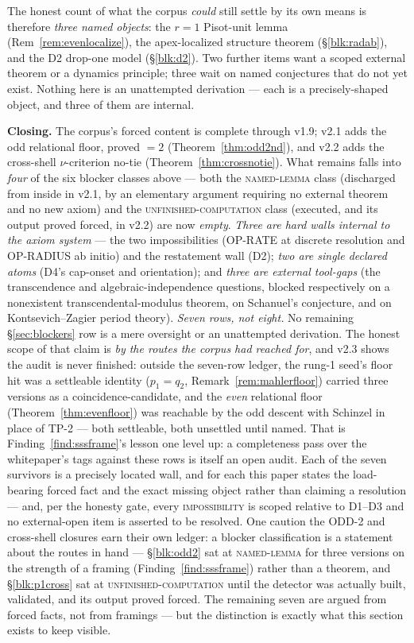 \documentclass[11pt]{article}
\theoremstyle{plain}
\theoremstyle{definition}
\theoremstyle{remark}
\begin{document}
\noindent The honest count of what the corpus \emph{could} still settle by its own
means is therefore \emph{three named objects}: the $r=1$ Pisot-unit lemma
(Rem~\ref{rem:evenlocalize}), the apex-localized structure theorem
(\S\ref{blk:radab}), and the D2 drop-one model (\S\ref{blk:d2}). Two further items
want a scoped external theorem or a dynamics principle; three wait on named
conjectures that do not yet exist. Nothing here is an unattempted derivation ---
each is a precisely-shaped object, and three of them are internal.

\smallskip\noindent
\textbf{Closing.} The corpus's forced content is complete through v1.9; v2.1 adds
the odd relational floor, proved $=2$ (Theorem~\ref{thm:odd2nd}), and v2.2 adds
the cross-shell $\nu$-criterion no-tie (Theorem~\ref{thm:crossnotie}). What
remains falls into \emph{four} of the six blocker classes above --- both the
\textsc{named-lemma} class (discharged from inside in v2.1, by an elementary
argument requiring no external theorem and no new axiom) and the
\textsc{unfinished-computation} class (executed, and its output proved forced, in
v2.2) are now \emph{empty}. \emph{Three are hard walls internal to the axiom
system} --- the two impossibilities (OP-RATE at discrete resolution and OP-RADIUS
ab initio) and the restatement wall (D2); \emph{two are single declared atoms}
(D4's cap-onset and orientation); and \emph{three are external tool-gaps} (the
transcendence and algebraic-independence questions, blocked respectively on a
nonexistent transcendental-modulus theorem, on Schanuel's conjecture, and on
Kontsevich--Zagier period theory). \emph{Seven rows, not eight.} No remaining \S\ref{sec:blockers}
row is a mere oversight or an unattempted derivation. The honest scope of that
claim is \emph{by the routes the corpus had reached for}, and v2.3 shows the audit
is never finished: outside the seven-row ledger, the rung-1 seed's floor hit was a
settleable identity ($p_1=q_2$, Remark~\ref{rem:mahlerfloor}) carried three
versions as a coincidence-candidate, and the \emph{even} relational floor
(Theorem~\ref{thm:evenfloor}) was reachable by the odd descent with Schinzel in
place of TP-2 --- both settleable, both unsettled until named. That is
Finding~\ref{find:sssframe}'s lesson one level up: a completeness pass over the
whitepaper's tags against these rows is itself an open audit. Each of the seven
survivors is a precisely located wall,
and for each this paper states the load-bearing forced fact and the exact missing
object rather than claiming a resolution --- and, per the honesty gate, every
\textsc{impossibility} is scoped relative to D1--D3 and no external-open item is
asserted to be resolved. One caution the ODD-2 and cross-shell closures earn
their own ledger: a blocker classification is a statement about the routes in
hand --- \S\ref{blk:odd2} sat at \textsc{named-lemma} for three versions on the
strength of a framing (Finding~\ref{find:sssframe}) rather than a theorem, and
\S\ref{blk:p1cross} sat at \textsc{unfinished-computation} until the detector was
actually built, validated, and its output proved forced. The remaining seven are
argued from forced facts, not from framings --- but the distinction is exactly
what this section exists to keep visible.
\end{document}
